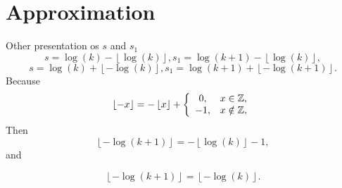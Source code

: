 \documentclass[titlepage,fleqn]{article}%
\providecommand{\U}[1]{\protect\rule{.1in}{.1in}}
\begin{document}
\section{Approximation}%

\label{Approximation}%


\bigskip Other presentation os $s$ and $s_{1}$%
\[
s=\log(k)-\left\lfloor \log\left(  k\right)  \right\rfloor ,s_{1}%
=\log(k+1)-\left\lfloor \log\left(  k\right)  \right\rfloor ,
\]%
\[
s=\log(k)+\left\lfloor -\log\left(  k\right)  \right\rfloor ,s_{1}%
=\log(k+1)+\left\lfloor -\log\left(  k+1\right)  \right\rfloor .
\]
Because%
\[
\left\lfloor -x\right\rfloor =-\left\lfloor x\right\rfloor +\left\{
\begin{array}
[c]{cc}%
0, & x\in%
\mathbb{Z}
,\\
-1, & x\notin%
\mathbb{Z}
,
\end{array}
\right.
\]
Then%
\[
\left\lfloor -\log\left(  k+1\right)  \right\rfloor =-\left\lfloor \log\left(
k\right)  \right\rfloor -1,
\]
and%

\[
\left\lfloor -\log\left(  k+1\right)  \right\rfloor =\left\lfloor -\log\left(
k\right)  \right\rfloor .
\]
\end{document}
